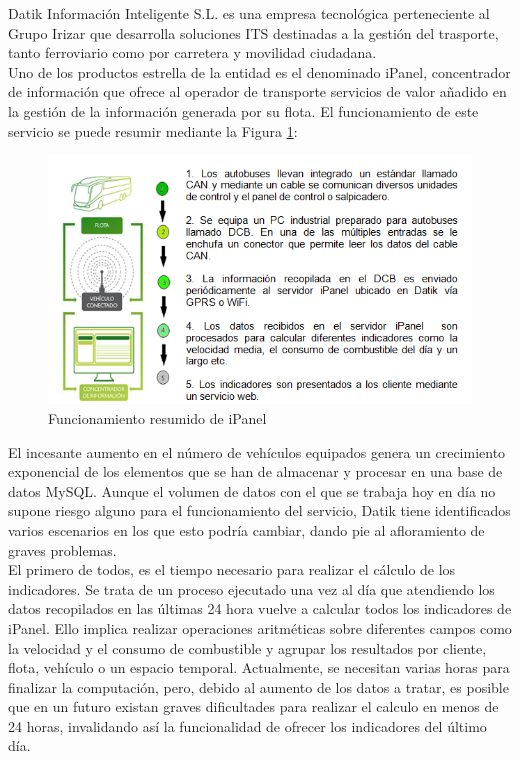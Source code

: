 Datik Información Inteligente S.L. es una empresa tecnológica perteneciente al Grupo Irizar  que desarrolla soluciones ITS destinadas a la gestión del trasporte, tanto ferroviario como por carretera y movilidad ciudadana.\\

Uno de los productos estrella de la entidad es el denominado iPanel, concentrador de  información que ofrece al operador de transporte servicios de valor añadido en la gestión de la información generada por su flota. El funcionamiento de este servicio se puede resumir mediante la Figura \ref{fig:ipanel}:\\

\begin{figure}[h]
	\centering
	\includegraphics[width=1\textwidth]{Ilustraciones/ipanel_infraesctructure.png}
	\caption{Funcionamiento resumido de iPanel}
	\label{fig:ipanel}
\end{figure}

El incesante aumento en el número de vehículos equipados genera un crecimiento exponencial de los elementos que se han de almacenar y procesar en una base de datos MySQL. Aunque el volumen de datos con el que se trabaja hoy en día no supone riesgo alguno para el funcionamiento del servicio, Datik tiene identificados varios escenarios en los que esto podría cambiar, dando pie al afloramiento de graves problemas.\\

El primero de todos, es el tiempo necesario para realizar el cálculo de los indicadores. Se trata de un proceso ejecutado una vez al día que atendiendo los datos recopilados en las últimas 24 hora vuelve a calcular todos los indicadores de iPanel. Ello implica realizar operaciones aritméticas sobre diferentes campos como la velocidad y el consumo de combustible y agrupar los resultados por cliente, flota, vehículo o un espacio temporal. Actualmente, se necesitan varias horas para finalizar la computación, pero, debido al aumento de los datos a tratar, es posible que en un futuro existan graves dificultades para realizar el calculo en menos de 24 horas, invalidando así la funcionalidad de ofrecer los indicadores del último día.\\

